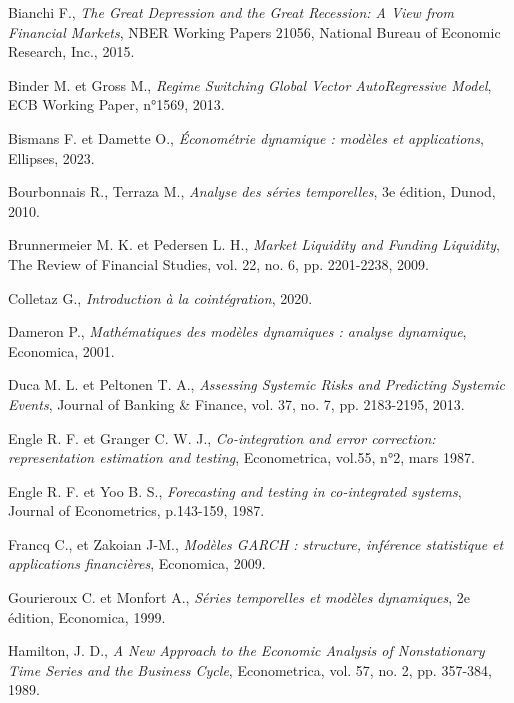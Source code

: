 \begin{thebibliography}{MMM99}
Bianchi F., 
\textit{The Great Depression and the Great Recession: A View from Financial Markets}, 
NBER Working Papers 21056, National Bureau of Economic Research, Inc., 2015.

Binder M. et Gross M., 
\textit{Regime Switching Global Vector AutoRegressive Model}, 
ECB Working Paper, n°1569, 2013.

Bismans F. et Damette O., 
\textit{Économétrie dynamique : modèles et applications}, 
Ellipses, 2023.

Bourbonnais R., Terraza M.,
\textit{Analyse des séries temporelles}, 3e édition,
Dunod, 2010.

Brunnermeier M. K. et Pedersen L. H., 
\textit{Market Liquidity and Funding Liquidity},
The Review of Financial Studies, vol. 22, no. 6, pp. 2201-2238, 2009.

Colletaz G.,
\textit{Introduction à la cointégration}, 2020.

Dameron P.,
\textit{Mathématiques des modèles dynamiques : analyse dynamique}, 
Economica, 2001.

Duca M. L. et Peltonen T. A.,
\textit{Assessing Systemic Risks and Predicting Systemic Events}, Journal of Banking \& Finance, vol. 37, no. 7, pp. 2183-2195, 2013.

Engle R. F. et Granger C. W. J., \textit{Co-integration and error correction: representation estimation and testing}, 
Econometrica, vol.55, n°2, mars 1987.

Engle R. F. et Yoo B. S., \textit{Forecasting and testing in co-integrated systems}, 
Journal of Econometrics, p.143-159, 1987.

Francq C., et Zakoian J-M.,
\textit{Modèles GARCH : structure, inférence statistique et applications financières},
Economica, 2009.

Gourieroux C. et Monfort A., 
\textit{Séries temporelles et modèles dynamiques},
2e édition, Economica, 1999.

Hamilton, J. D.,
\textit{A New Approach to the Economic Analysis of Nonstationary Time Series and the Business Cycle}, Econometrica, vol. 57, no. 2, pp. 357-384, 1989.


\end{thebibliography}
